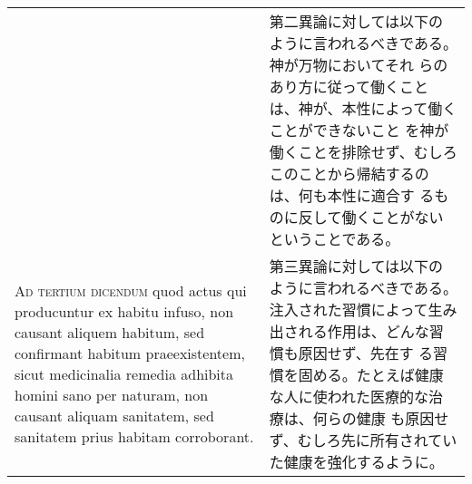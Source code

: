 \documentclass[10pt]{jsarticle} %
\begin{document}
\begin{longtable}{p{21em}p{21em}}
&

第二異論に対しては以下のように言われるべきである。神が万物においてそれ
らのあり方に従って働くことは、神が、本性によって働くことができないこと
を神が働くことを排除せず、むしろこのことから帰結するのは、何も本性に適合す
るものに反して働くことがないということである。


\\



{\scshape Ad tertium dicendum} quod actus qui producuntur ex habitu infuso, non
causant aliquem habitum, sed confirmant habitum praeexistentem, sicut
medicinalia remedia adhibita homini sano per naturam, non causant
aliquam sanitatem, sed sanitatem prius habitam corroborant.


&

第三異論に対しては以下のように言われるべきである。
注入された習慣によって生み出される作用は、どんな習慣も原因せず、先在す
 る習慣を固める。たとえば健康な人に使われた医療的な治療は、何らの健康
 も原因せず、むしろ先に所有されていた健康を強化するように。



\end{longtable}
\end{document}
